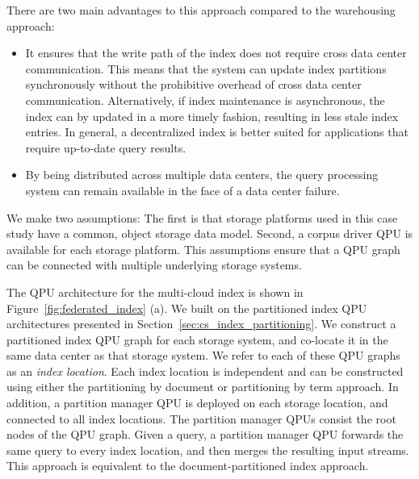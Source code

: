 There are two main advantages to this approach compared to the warehousing approach:
\begin{itemize}
  \item It ensures that the write path of the index does not require cross data center communication.
  This means that the system can update index partitions synchronously without the prohibitive overhead of
  cross data center communication.
  Alternatively, if index maintenance is asynchronous,
  the index can by updated in a more timely fashion, resulting in less stale index entries.
  In general, a decentralized index is better suited for applications that require up-to-date query results.

  \item By being distributed across multiple data centers,
  the query processing system can remain available in the face of a data center failure.
\end{itemize}

We make two assumptions:
The first is that storage platforms used in this case study have a common, object storage data model.
Second, a corpus driver QPU is available for each storage platform.
This assumptions ensure that a QPU graph can be connected with multiple underlying storage systems.

The QPU architecture for the multi-cloud index is shown in Figure~\ref{fig:federated_index} (a).
We built on the partitioned index QPU architectures presented in Section~\ref{sec:cs_index_partitioning}.
We construct a partitioned index QPU graph for each storage system, and co-locate it in the same data center as that
storage system.
We refer to each of these QPU graphs as an \textit{index location}.
Each index location is independent and can be constructed using either the partitioning by document or partitioning by
term approach.
In addition, a partition manager QPU is deployed on each storage location,
and connected to all index locations.
The partition manager QPUs consist the root nodes of the QPU graph.
Given a query, a partition manager QPU forwards the same query to every index location,
and then merges the resulting input streams.
This approach is equivalent to the document-partitioned index approach.

